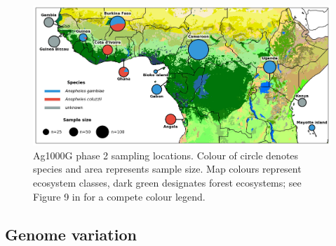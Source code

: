 \documentclass[a4paper,11pt,abstracton,hidelinks]{scrartcl}
\begin{document}
\begin{figure}[H]
	\begin{center}
		\includegraphics*[width=5.8in]{artwork/collection_site_map.jpg}
	\end{center}
	\caption{Ag1000G phase 2 sampling locations. Colour of circle denotes species and area represents sample size. Map colours represent ecosystem classes, dark green designates forest ecosystems; see Figure 9 in \cite{sayre2013} for a compete colour legend.}
	\label{fig:sample_map}
\end{figure}


%


\subsection*{Genome variation}
\end{document}

